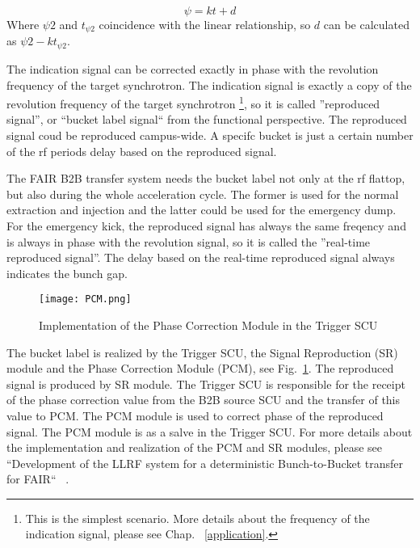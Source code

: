 \begin{equation}
\psi= kt+d\label{linear}
\end{equation}
Where $\psi2$ and $t_{\psi2}$ coincidence with the linear relationship, so $d$ can be calculated as $\psi2-kt_{\psi2}$.


The indication signal can be corrected exactly in phase with the revolution frequency of the target synchrotron.  The indication signal is exactly a copy of the revolution frequency of the target synchrotron \footnote{This is the simplest scenario. More details about the frequency of the indication signal, please see Chap. ~\ref{application}.}, so it is called ''reproduced signal'', or ``bucket label signal`` from the functional perspective.  The reproduced signal coud be reproduced campus-wide. A specifc bucket is just a certain number of the rf periods delay based on the reproduced signal.


The FAIR B2B transfer system needs the bucket label not only at the rf flattop, but also during the whole acceleration cycle. The former is used for the normal extraction and injection and the latter could be used for the emergency dump. For the emergency kick, the reproduced signal has always the same freqency and is always in phase with the revolution signal, so it is called the ''real-time reproduced signal''. The delay based on the real-time reproduced signal always indicates the bunch gap.


 \begin{figure}[!htb]
   \centering   
   \texttt{[image: PCM.png]}
   \caption{Implementation of the Phase Correction Module in the Trigger SCU}
   \label{PCM}
\end{figure}
The bucket label is realized by the Trigger SCU, the Signal Reproduction (SR) module and the Phase Correction Module (PCM), see Fig.~\ref{PCM}. The reproduced signal is produced by SR module. The Trigger SCU is responsible for the receipt of the phase correction value from the B2B source SCU and the transfer of this value to PCM. The PCM module is used to correct phase of the reproduced signal. The PCM module is as a salve in the Trigger SCU. For more details about the implementation and realization of the PCM and SR modules, please see ``Development of the LLRF system for a deterministic Bunch-to-Bucket transfer for FAIR`` ~\cite{ferrand_development_????}. 

